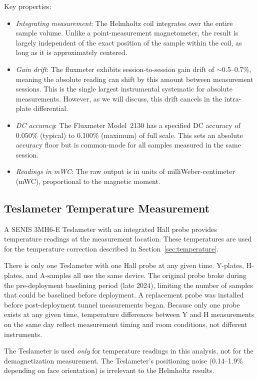 \documentclass[11pt,letterpaper]{article}
\begin{document}
Key properties:
\begin{itemize}
    \item \emph{Integrating measurement}: The Helmholtz coil integrates over
    the entire sample volume. Unlike a point-measurement magnetometer, the
    result is largely independent of the exact position of the sample within
    the coil, as long as it is approximately centered.
    \item \emph{Gain drift}: The fluxmeter exhibits session-to-session gain
    drift of $\sim$0.5--0.7\%, meaning the absolute reading can shift by this
    amount between measurement sessions. This is the single largest
    instrumental systematic for absolute measurements. However, as we will
    discuss, this drift cancels in the intra-plate differential.
    \item \emph{DC accuracy}: The Fluxmeter Model~2130 has a specified DC
    accuracy of 0.050\% (typical) to 0.100\% (maximum) of full scale. This
    sets an absolute accuracy floor but is common-mode for all samples
    measured in the same session.
    \item \emph{Readings in mWC}: The raw output is in units of
    milliWeber-centimeter (mWC), proportional to the magnetic moment.
\end{itemize}

\subsection{Teslameter Temperature Measurement}

A SENIS 3MH6-E Teslameter with an integrated Hall probe provides temperature
readings at the measurement location. These temperatures are used for the
temperature correction described in Section~\ref{sec:temperature}.

There is only one Teslameter with one
Hall probe at any given time. Y-plates, H-plates, and A-samples all use the
same device. The original probe broke during the pre-deployment baselining
period (late 2024), limiting the number of samples that could be baselined
before deployment. A replacement probe was installed before post-deployment
tunnel measurements began. Because only one probe exists at any given time,
temperature differences between Y and H measurements on the same day reflect
measurement timing and room conditions, not different instruments.

The Teslameter is used \emph{only} for temperature readings in this analysis,
not for the demagnetization measurement. The Teslameter's positioning noise
(0.14--1.9\% depending on face orientation) is irrelevant to the Helmholtz
results.
\end{document}
